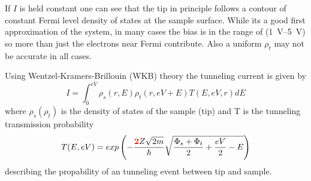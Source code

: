 \documentclass[
10pt,					%
a4paper,				%
twoside,				%
BCOR=8mm,				%
headings=normal,		%
headsepline,			%
footsepline,			%
plainfootsepline,		%
]{scrbook}
\begin{document}
%
If $I$ is held constant one can see that the tip in principle follows a contour of constant Fermi level density of states at the sample surface. While its a good first approximation of the system, in many cases the bias is in the range of (\SIrange{1}{5}{\V}) so more than just the electrons near Fermi contribute. Also a uniform $\rho_t$ may not be accurate in all cases.

Using  Wentzel-Kramers-Brillouin (WKB) theory\cite{wentzel_verallgemeinerung_1926, kramers_wellenmechanik_1926, brillouin_mecanique_1926} the tunneling current is given by
\begin{equation}
I=\int_0^{eV}\rho_s(r,E)\rho_t(r,eV+E)T(E,eV,r)dE
\label{WKB}
\end{equation}
where $\rho_s(\rho_t)$ is the density of states of the sample (tip) and T is the tunneling transmission probability
\begin{equation}
T(E,eV)=exp\left(-\frac{\textcolor{red}{\textbf{2}}Z\sqrt{2m}}{\hbar}\sqrt{\frac{\Phi_s+\Phi_t}{2}+\frac{eV}{2}-E}\right)
\label{Transmission-function} 
\end{equation}
describing the propability of an tunneling event between tip and sample.
\end{document}
